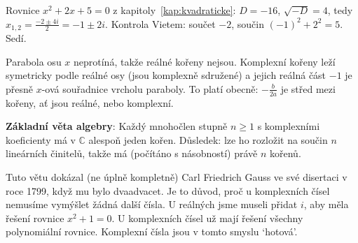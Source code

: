 \begin{example}
  Rovnice $x^2 + 2x + 5 = 0$ z kapitoly~\ref{kap:kvadraticke}: $D = -16$, $\sqrt{-D} = 4$, tedy $x_{1,2} = \frac{-2\pm 4i}{2} = -1\pm 2i$. Kontrola Vietem: součet $-2$, součin ${(-1)}^2 + 2^2 = 5$. Sedí.

  \begin{center}
  \end{center}
  Parabola osu $x$ neprotíná, takže reálné kořeny nejsou. Komplexní kořeny leží symetricky podle reálné osy (jsou komplexně sdružené) a jejich reálná část $-1$ je přesně $x$-ová souřadnice vrcholu paraboly. To platí obecně: $-\frac{b}{2a}$ je střed mezi kořeny, ať jsou reálné, nebo komplexní.
\end{example}

\begin{definitionbox}
  \textbf{Základní věta algebry}: Každý mnohočlen stupně $n\geq 1$ s komplexními koeficienty má v $\mathbb{C}$ alespoň jeden kořen. Důsledek: lze ho rozložit na součin $n$ lineárních činitelů, takže má (počítáno s násobností) právě $n$ kořenů.
\end{definitionbox}

Tuto větu dokázal (ne úplně kompletně) Carl Friedrich Gauss ve své disertaci v roce 1799, když mu bylo dvaadvacet. Je to důvod, proč u komplexních čísel nemusíme vymýšlet žádná další čísla. U reálných jsme museli přidat $i$, aby měla řešení rovnice $x^2 + 1 = 0$. U komplexních čísel už mají řešení všechny polynomiální rovnice. Komplexní čísla jsou v tomto smyslu `hotová'.

